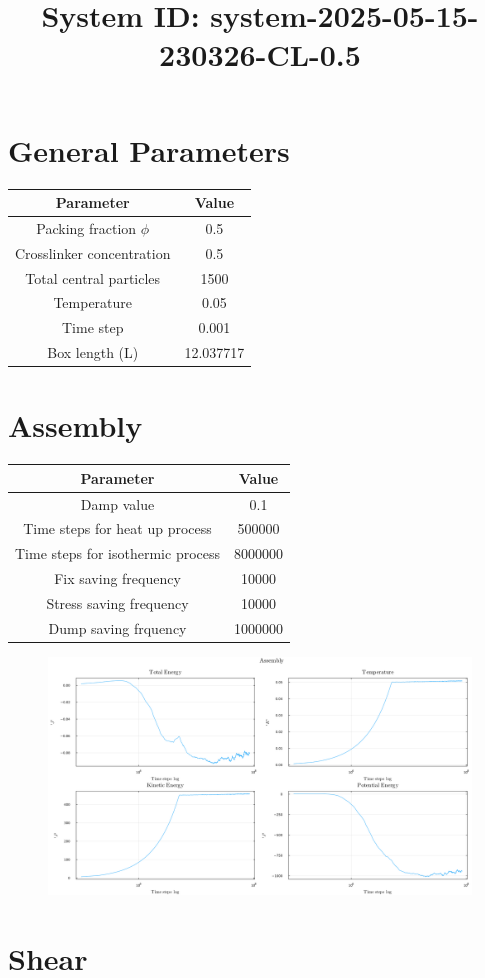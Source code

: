 \documentclass{tareaClass}
\title{ System ID: system-2025-05-15-230326-CL-0.5 }
\begin{document}
\rhead{ \today }

\maketitle

\section{General Parameters}

\begin{table}[ht!]
\centering
\begin{tabular}{|c|c|} 
\hline
Parameter & Value  \\ 
  \hline
    Packing fraction $\phi$ & 0.5 \\
    Crosslinker concentration & 0.5 \\
    Total central particles & 1500 \\
    Temperature & 0.05 \\
    Time step & 0.001 \\
    Box length (L) & 12.037717 \\
  \hline
\end{tabular}
\end{table}



\section{Assembly}

\begin{table}[ht!]
\centering
\begin{tabular}{|c|c|} 
\hline
Parameter & Value  \\ 
  \hline
    Damp value & 0.1 \\
    Time steps for heat up process & \num{500000} \\
    Time steps for isothermic process & \num{8000000} \\
    Fix saving frequency  & \num{10000} \\
    Stress saving frequency & \num{10000} \\
    Dump saving frquency  & \num{1000000} \\
  \hline
\end{tabular}
\end{table}

\begin{figure}[ht!]
\centering
\includegraphics[width=\textwidth]{imgs/2025-05-15-230326-system_assembly.png}
\end{figure}

\newpage

\section{Shear}
\end{document}
